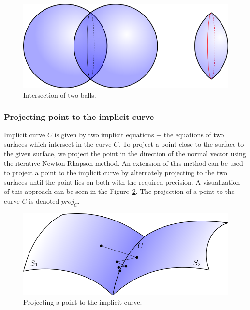 \begin{figure}[h!]
    \centerline{\includegraphics[scale=0.5]{images/img35}}
    \caption[Intersection of two balls]
    {Intersection of two balls.}
    \label{img:35}
\end{figure}

\subsubsection{Projecting point to the implicit curve}

Implicit curve $C$ is given by two implicit equations $-$ the equations of two surfaces
which intersect in the curve $C$.
To project a point close to the surface to the given surface, we 
project the point in the direction of the normal vector using the iterative 
Newton-Rhapson method. An extension of this method can be used to project a point
to the implicit curve by alternately projecting to the two surfaces until the
point lies on both with the required precision. A visualization of this approach can be
seen in the Figure~\ref{img:36}. The projection of a point to the curve $C$ is denoted $proj_C$.

\begin{figure}[h!]
    \centerline{\includegraphics[scale=0.5]{images/img36}}
    \caption[Projecting a point to the implicit curve]
    {Projecting a point to the implicit curve.}
    \label{img:36}
\end{figure}

